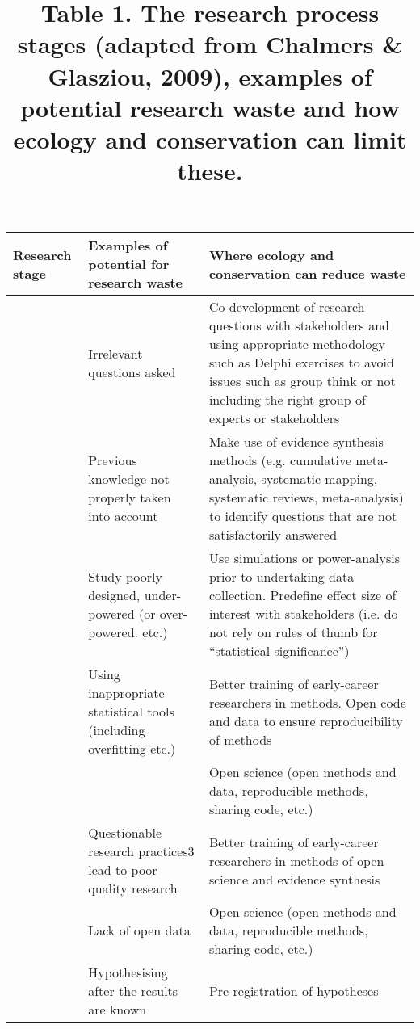 \documentclass[]{article}
\title{Table 1. The research process stages (adapted from Chalmers \& Glasziou,
2009), examples of potential research waste and how ecology and
conservation can limit these.}
\author{}
\date{}
\begin{document}
\maketitle

\begin{tabular}{>{\bfseries}lll}
\toprule
Research stage & Examples of potential for research waste & Where ecology and conservation can reduce waste\\
\midrule
 & Irrelevant questions asked & Co-development of research questions with stakeholders and using appropriate methodology such as Delphi exercises to avoid issues such as group think or not including the right group of experts or stakeholders\\

\multirow{-2}{*}{\raggedright\arraybackslash Questions relevant to stakeholders} & Previous knowledge not properly taken into account & Make use of evidence synthesis methods (e.g. cumulative meta-analysis, systematic mapping, systematic reviews, meta-analysis) to identify questions that are not satisfactorily answered\\
\cmidrule{1-3}
 & Study poorly designed, under-powered (or over-powered. etc.) & Use simulations or power-analysis prior to undertaking data collection. Predefine effect size of interest with stakeholders (i.e. do not rely on rules of thumb for “statistical significance”)\\

 & Using inappropriate statistical tools (including overfitting etc.) & Better training of early-career researchers in methods. Open code and data to ensure reproducibility of methods\\

 &  & Open science (open methods and data, reproducible methods, sharing code, etc.)\\

\multirow{-4}{*}{\raggedright\arraybackslash Appropriate design and methods} & \multirow{-2}{*}{\raggedright\arraybackslash Questionable research practices3 lead to poor quality research} & Better training of early-career researchers in methods of open science and evidence synthesis\\
\cmidrule{1-3}
 & Lack of open data & Open science (open methods and data, reproducible methods, sharing code, etc.)\\

 & Hypothesising after the results are known & Pre-registration of hypotheses\\


\end{tabular}
\end{document}
